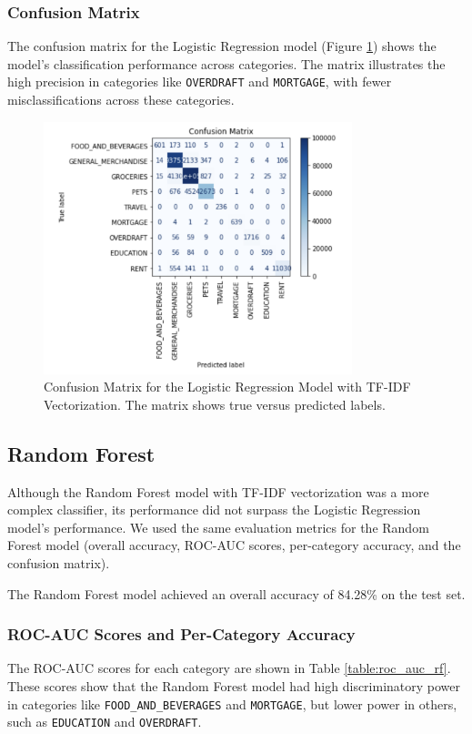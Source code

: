 \documentclass[12pt,letterpaper]{article}
\begin{document}
\subsubsection{Confusion Matrix}
The confusion matrix for the Logistic Regression model (Figure \ref{fig:confusion_matrix_logreg}) shows the model's classification performance across categories. The matrix illustrates the high precision in categories like \texttt{OVERDRAFT} and \texttt{MORTGAGE}, with fewer misclassifications across these categories. 

\begin{figure}[h]
    \centering
    \includegraphics[width=0.8\textwidth]{figure/log_reg_confusion.png}
    \caption{Confusion Matrix for the Logistic Regression Model with TF-IDF Vectorization. The matrix shows true versus predicted labels.}
    \label{fig:confusion_matrix_logreg}
\end{figure}

\subsection{Random Forest}

Although the Random Forest model with TF-IDF vectorization was a more complex classifier, its performance did not surpass the Logistic Regression model's performance. We used the same evaluation metrics for the Random Forest model (overall accuracy, ROC-AUC scores, per-category accuracy, and the confusion matrix).

The Random Forest model achieved an overall accuracy of 84.28\% on the test set.

\subsubsection{ROC-AUC Scores and Per-Category Accuracy}
The ROC-AUC scores for each category are shown in Table \ref{table:roc_auc_rf}. These scores show that the Random Forest model had high discriminatory power in categories like \texttt{FOOD\_AND\_BEVERAGES} and \texttt{MORTGAGE}, but lower power in others, such as \texttt{EDUCATION} and \texttt{OVERDRAFT}.
\end{document}
